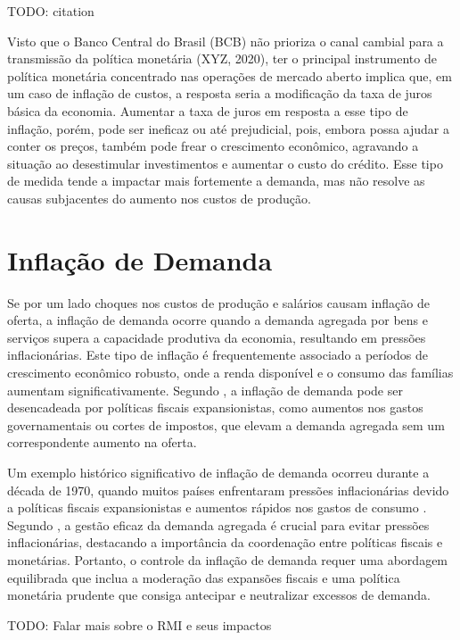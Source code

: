 \documentclass[12pt,oneside,a4paper,chapter=TITLE,english,brazil,sumario=abnt-6027-2012]{abntex2}
\begin{document}
TODO: citation

Visto que o Banco Central do Brasil (BCB) não prioriza o canal cambial para a transmissão da política monetária (XYZ, 2020), ter o principal instrumento de política monetária concentrado nas operações de mercado aberto implica que, em um caso de inflação de custos, a resposta seria a modificação da taxa de juros básica da economia. Aumentar a taxa de juros em resposta a esse tipo de inflação, porém, pode ser ineficaz ou até prejudicial, pois, embora possa ajudar a conter os preços, também pode frear o crescimento econômico, agravando a situação ao desestimular investimentos e aumentar o custo do crédito. Esse tipo de medida tende a impactar mais fortemente a demanda, mas não resolve as causas subjacentes do aumento nos custos de produção.

\section{Inflação de Demanda}

Se por um lado choques nos custos de produção e salários causam inflação de oferta, a inflação de demanda ocorre quando a demanda agregada por bens e serviços supera a capacidade produtiva da economia, resultando em pressões inflacionárias. Este tipo de inflação é frequentemente associado a períodos de crescimento econômico robusto, onde a renda disponível e o consumo das famílias aumentam significativamente. Segundo , a inflação de demanda pode ser desencadeada por políticas fiscais expansionistas, como aumentos nos gastos governamentais ou cortes de impostos, que elevam a demanda agregada sem um correspondente aumento na oferta.

Um exemplo histórico significativo de inflação de demanda ocorreu durante a década de 1970, quando muitos países enfrentaram pressões inflacionárias devido a políticas fiscais expansionistas e aumentos rápidos nos gastos de consumo \cite{blinder_2008_the}. Segundo \cite{woodford_2009_interest}, a gestão eficaz da demanda agregada é crucial para evitar pressões inflacionárias, destacando a importância da coordenação entre políticas fiscais e monetárias. Portanto, o controle da inflação de demanda requer uma abordagem equilibrada que inclua a moderação das expansões fiscais e uma política monetária prudente que consiga antecipar e neutralizar excessos de demanda.

TODO: Falar mais sobre o RMI e seus impactos
\end{document}
